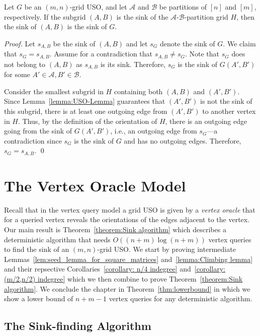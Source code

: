 \documentclass[runningheads,a4paper]{llncs}
\newcommand{\A}{\ensuremath{\mathcal A}}
\newcommand{\B}{\ensuremath{\mathcal B}}
\newcommand{\s}[1]{\ensuremath{s_{\scriptscriptstyle#1}}}
\begin{document}
\begin{theorem}
\label{thm:the_sink_of_the_sink_of_the_induced_orientation_is_the_global_sink}

Let $G$ be an $(m,n)$-grid USO,
and let $\A$ and $\B$ be partitions of $[n]$ and $[m]$, respectively.
If the subgrid $(A,B)$ is the sink of the $\A$-$\B$-partition grid $H$, then the sink of $(A,B)$ is the sink of $G$.
\end{theorem}
\begin{proof}
Let $\s{A,B}$ be the sink of $(A,B)$ and let $\s{G}$ denote the sink of $G$.
We claim that $\s{G} = \s{A,B}$.
Assume for a contradiction that $\s{A,B}\neq \s{G}$.
Note that $\s{G}$ does not belong to $(A,B)$ as $\s{A,B}$ is its sink.
Therefore, $\s{G}$ is the sink of $G(A', B')$ for some $A'\in \A, B'\in \B$.

Consider the smallest subgrid in $H$ containing both $(A,B)$ and $(A', B')$. 
Since Lemma~\ref{lemma:USO-Lemma} guarantees that $(A',B')$ is not the sink of this subgrid, there is at least one outgoing edge from $(A',B')$ to another vertex in $H$.
Thus, by the definition of the orientation of $H$, there is an outgoing edge going from the sink of $G(A',B')$, i.e., an outgoing edge from $\s{G}$---a contradiction since $\s{G}$ is the sink of $G$ and has no outgoing edges. 
Therefore, $\s{G} = \s{A,B}$. \qed
\end{proof}


\section{The Vertex Oracle Model}
\label{section:The vertex oracle model}

Recall that in the vertex query model a grid USO is given by a \emph{vertex oracle} that for a queried vertex reveals the orientations of the edges adjacent to the vertex. Our main result is Theorem~\ref{theorem:Sink algorithm} which describes a deterministic algorithm that needs $O((n + m) \log (n + m))$ vertex queries to find the sink of an $(m, n)$-grid USO. We start by proving intermediate Lemmas~\ref{lem:seed_lemma_for_square_matrices} and~\ref{lemma:Climbing lemma} and their repsective Corollaries~\ref{corollary: n/4 indegree} and~\ref{corollary: (m/2,n/2) indegree} which we then combine to prove Theorem~\ref{theorem:Sink algorithm}. We conclude the chapter in Theorem~\ref{thm:lowerbound} in which we show a lower bound of $n+m-1$ vertex queries for any deterministic algorithm.

\subsection{The Sink-finding Algorithm}
\label{section:the_sink_finding_algorithm}
\end{document}
